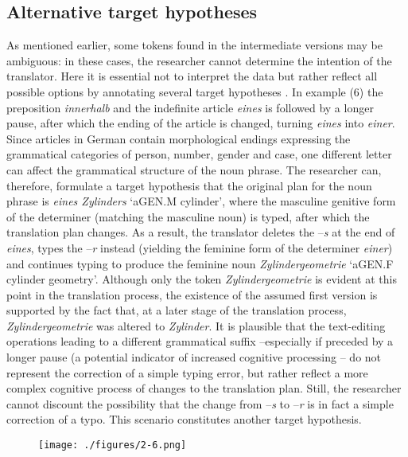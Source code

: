 \documentclass[output=paper]{LSP/langsci}
\begin{document}
\subsection{Alternative target hypotheses}
As mentioned earlier, some tokens found in the intermediate versions may be ambiguous: in these cases, the researcher cannot determine the intention of the translator. Here it is essential not to interpret the data but rather reflect all possible options by annotating several target hypotheses \citep{Lüdeling2008}. In example (6) the preposition \textit{innerhalb} and the indefinite article \textit{eines} is followed by a longer pause, after which the ending of the article is changed, turning \textit{eines} into \textit{einer}. Since articles in German contain morphological endings expressing the grammatical categories of person, number, gender and case, one different letter can affect the grammatical structure of the noun phrase. The researcher can, therefore, formulate a target hypothesis that the original plan for the noun phrase is \textit{eines Zylinders} ‘a{\tiny GEN.M} cylinder’, where the masculine genitive form of the determiner (matching the masculine noun) is typed, after which the translation plan changes. As a result, the translator deletes the –\textit{s} at the end of \textit{eines}, types the –\textit{r} instead (yielding the feminine form of the determiner \textit{einer}) and continues typing to produce the feminine noun \textit{Zylindergeometrie} ‘a{\tiny GEN.F} cylinder geometry’. Although only the token \textit{Zylindergeometrie} is evident at this point in the translation process, the existence of the assumed first version is supported by the fact that, at a later stage of the translation process, \textit{Zylindergeometrie} was altered to \textit{Zylinder}. It is plausible that the text-editing operations leading to a different grammatical suffix –especially if preceded by a longer pause (a potential indicator of increased cognitive processing \citep[see][]{Dragsted2005} – do not represent the correction of a simple typing error, but rather reflect a more complex cognitive process of changes to the translation plan. Still, the researcher cannot discount the possibility that the change from –\textit{s} to –\textit{r} is in fact a simple correction of a typo. This scenario constitutes another target hypothesis.

\begin{figure}
\texttt{[image: ./figures/2-6.png]}
\end{figure}
\end{document}
